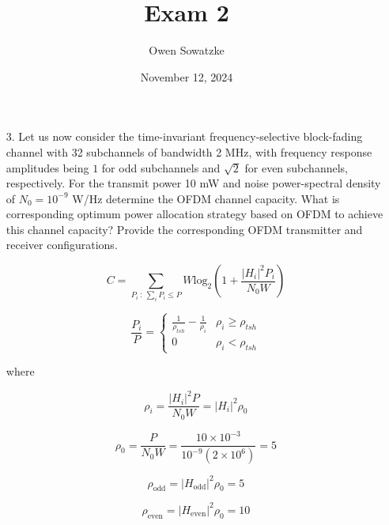 \documentclass[fleqn]{article}
\title{Exam 2}
\author{Owen Sowatzke}
\date{November 12, 2024}
\newcommand{\zerodisplayskip}{
	\setlength{\abovedisplayskip}{0pt}%
	\setlength{\belowdisplayskip}{0pt}%
	\setlength{\abovedisplayshortskip}{0pt}%
	\setlength{\belowdisplayshortskip}{0pt}%
	\setlength{\mathindent}{0pt}}
\begin{document}
	\offinterlineskip
	\setlength{\lineskip}{12pt}
	\zerodisplayskip
	\maketitle
	
	\begin{enumerate}
		\item[3.] Let us now consider the time-invariant frequency-selective block-fading channel with 32 subchannels of bandwidth 2 MHz, with frequency response amplitudes being $1$ for odd subchannels and $\sqrt{2}$ for even subchannels, respectively. For the transmit power 10 mW and noise power-spectral density of $N_0=10^{-9}$ W/Hz determine the OFDM channel capacity. What is corresponding optimum power allocation strategy based on OFDM to achieve this channel capacity? Provide the corresponding OFDM transmitter and receiver configurations.
		
		\begin{equation*}
			C = \underset{P_i \ :\ \sum_i{P_i \leq P}}{\sum}{W\text{log}_2\left(1 + \frac{|H_i|^2P_i}{N_0W}\right)}
		\end{equation*}
		
		\begin{equation*}
			\frac{P_i}{P} = \begin{cases}
				\frac{1}{\rho_{tsh}} - \frac{1}{\rho_i} & \rho_i \geq \rho_{tsh} \\
				0 & \rho_i < \rho_{tsh}
			\end{cases}
		\end{equation*}
		
		where
		
		\begin{equation*}
			\rho_i = \frac{|H_i|^2P}{N_0W} = |H_i|^2\rho_0 
		\end{equation*}
		
		\begin{equation*}
			\rho_0 = \frac{P}{N_0W} = \frac{10 \times 10^{-3}}{10^{-9}(2 \times 10^6)} = 5
		\end{equation*}
		
		\pagebreak
		\begin{equation*}
			\rho_{\text{odd}} = |H_{\text{odd}}|^2\rho_0 = 5
		\end{equation*}
		
		\begin{equation*}
			\rho_{\text{even}} = |H_{\text{even}}|^2\rho_0 = 10
		\end{equation*}
		

\end{enumerate}
\end{document}
